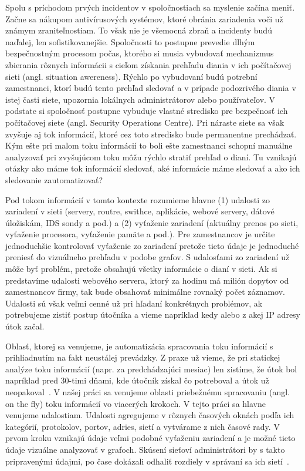 \documentclass[thesismargins, thesislinespacing, openright, upjsfrontpage, combineabstracts]{rnthesis}
\begin{document}
Spolu s príchodom prvých incidentov v spoločnostiach sa myslenie začína meniť. Začne sa nákupom antivírusových systémov, ktoré obránia zariadenia voči už známym zraniteľnostiam. To však nie je všemocná zbraň a incidenty budú naďalej, len sofistikovanejšie. Spoločnosti to postupne prevedie dlhým bezpečnostným procesom počas, ktorého si musia vybudovať mechanizmus zbierania rôznych informácii s cieľom získania prehľadu diania v ich počítačovej sieti (angl. situation awereness). Rýchlo po vybudovaní budú potrební zamestnanci, ktorí budú tento prehľad sledovať a v prípade podozrivého diania v istej časti siete, upozornia lokálnych administrátorov alebo používateľov. V podstate si spoločnosť postupne vybuduje vlastné stredisko pre bezpečnosť ich počítačovej siete (angl. Security Operations Centre). Pri náraste siete sa však zvyšuje aj tok informácií, ktoré cez toto stredisko bude permanentne prechádzať. Kým ešte pri malom toku informácií to boli ešte zamestnanci schopní manuálne analyzovať pri zvyšujúcom toku môžu rýchlo stratiť prehľad o dianí. Tu vznikajú otázky ako máme tok informácií sledovať, aké informácie máme sledovať a ako ich sledovanie zautomatizovať?

Pod tokom informácií v tomto kontexte rozumieme hlavne (1) udalosti zo zariadení v sieti (servery, routre, swithce, aplikácie, webové servery, dátové úložiskám, IDS sondy a pod.) a (2) vyťaženie zariadení (aktuálny prenos po sieti, vyťaženie procesora, vyťaženie pamäte a pod.). Pre zamestnancov je určite jednoduchšie kontrolovať vyťaženie zo zariadení pretože tieto údaje je jednoduché preniesť do vizuálneho prehľadu v podobe grafov. S udalosťami zo zariadení už môže byť problém, pretože obsahujú všetky informácie o dianí v sieti. Ak si predstavíme udalosti webového servera, ktorý za hodinu má milión dopytov od zamestnancov firmy, tak bude obsahovať minimálne rovnaký počet záznamov. Udalosti sú však veľmi cenné už pri hľadaní konkrétnych problémov, ak potrebujeme zistiť postup útočníka a vieme napríklad kedy alebo z akej IP adresy útok začal. 

Oblasť, ktorej sa venujeme, je automatizácia spracovania toku informácií s prihliadnutím na fakt neustálej prevádzky. Z praxe už vieme, že pri statickej analýze toku informácií (napr. za predchádzajúci mesiac) len zistíme, že útok bol napríklad pred 30-timi dňami, kde útočník získal čo potreboval a útok už neopakoval~\cite{park2010study}. V našej práci sa venujeme oblasti priebežnému spracovaniu (angl. on the fly) toku informácií vo viacerých krokoch. V tejto práci sa hlavne venujeme udalostiam. Udalosti agregujeme v rôznych časových oknách podľa ich kategórií, protokolov, portov, adries, sietí a vytvárame z nich časové rady. V prvom kroku vznikajú údaje veľmi podobné vyťaženiu zariadení a je možné tieto údaje vizuálne analyzovať v grafoch. Skúsení sieťoví administrátori by s takto pripravenými údajmi, po čase dokázali odhaliť rozdiely v správaní sa ich sietí~\cite{papagiannaki2005long}.
\end{document}
